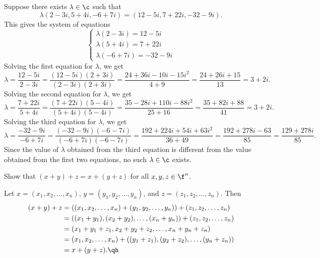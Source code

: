 \begin{sol}
    Suppose there exists $\lambda \in \c$ such that
    \[\lambda(2 - 3i, 5 + 4i, -6 + 7i) = (12 - 5i, 7 + 22i, -32 - 9i).\]
    This gives the system of equations
    \[\begin{cases}
        \lambda(2 - 3i) = 12 - 5i \\
        \lambda(5 + 4i) = 7 + 22i \\
        \lambda(-6 + 7i) = -32 - 9i
    \end{cases}\]
    Solving the first equation for $\lambda$, we get
    \[\lambda = \frac{12 - 5i}{2 - 3i} = \frac{(12 - 5i)(2 + 3i)}{(2 - 3i)(2 + 3i)} = \frac{24 + 36i - 10i - 15i^2}{4 + 9} = \frac{24 + 26i + 15}{13} = 3 + 2i.\]
    Solving the second equation for $\lambda$, we get
    \[\lambda = \frac{7 + 22i}{5 + 4i} = \frac{(7 + 22i)(5 - 4i)}{(5 + 4i)(5 - 4i)} = \frac{35 - 28i + 110i - 88i^2}{25 + 16} = \frac{35 + 82i + 88}{41} = 3 + 2i.\]
    Solving the third equation for $\lambda$, we get
    \[\lambda = \frac{-32 - 9i}{-6 + 7i} = \frac{(-32 - 9i)(-6 - 7i)}{(-6 + 7i)(-6 - 7i)} = \frac{192 + 224i + 54i + 63i^2}{36 + 49} = \frac{192 + 278i - 63}{85} = \frac{129 + 278i}{85}.\]
    Since the value of $\lambda$ obtained from the third equation is different from the value obtained from the first two equations, no such $\lambda \in \c$ exists. \qh
\end{sol}

\begin{exercise}[1a11]
    Show that $(x + y) + z = x + (y + z)$ for all $x, y, z \in \f^n$.
\end{exercise}

\begin{sol}
    Let $x = (x_1, x_2, \ldots, x_n)$, $y = (y_1, y_2, \ldots, y_n)$, and $z = (z_1, z_2, \ldots, z_n)$. Then
    \begin{align*}
        (x + y) + z & = ((x_1, x_2, \ldots, x_n) + (y_1, y_2, \ldots, y_n)) + (z_1, z_2, \ldots, z_n) \\
        & = ( (x_1 + y_1), (x_2 + y_2), \ldots, (x_n + y_n) ) + (z_1, z_2, \ldots, z_n) \\
        & = (x_1 + y_1 + z_1, x_2 + y_2 + z_2, \ldots, x_n + y_n + z_n) \\
        & = (x_1, x_2, \ldots, x_n) + ((y_1 + z_1), (y_2 + z_2), \ldots, (y_n + z_n)) \\
        & = x + (y + z). \qh
    \end{align*}
\end{sol}

